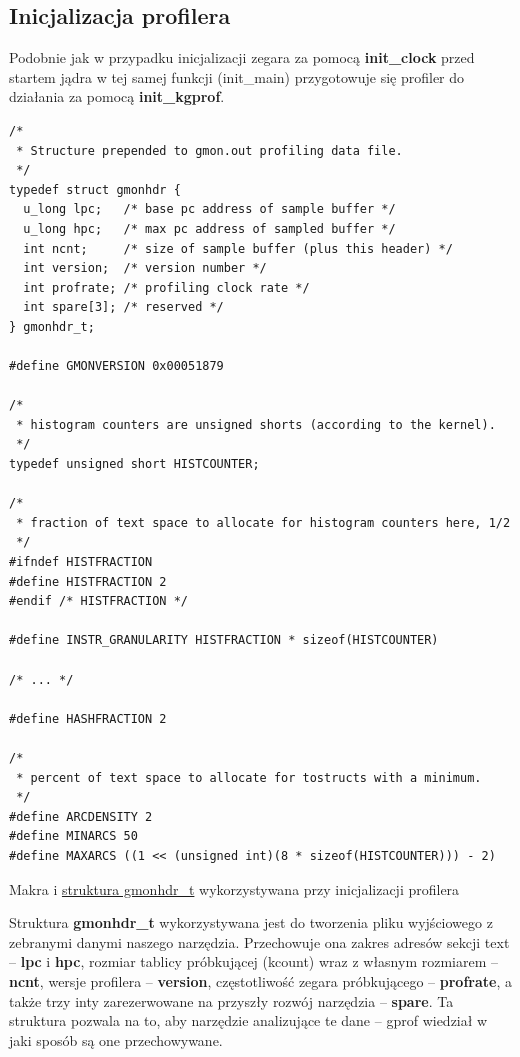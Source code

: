 \documentclass[shortabstract]{iithesis}
\theoremstyle{definition} \newtheorem*{definition}{Definicja}
\theoremstyle{definition} \newtheorem*{example}{Przykład}
\theoremstyle{definition} \newtheorem*{remark}{Uwaga}
\newenvironment{longlisting}{\captionsetup{type=listing}}{}
\begin{document}
\subsection{Inicjalizacja profilera}

Podobnie jak w przypadku inicjalizacji zegara za pomocą \textbf{init\_clock} przed startem jądra w tej samej funkcji (init\_main) przygotowuje się profiler do działania za pomocą \textbf{init\_kgprof}.

\begin{longlisting}
  \begin{verbatim}
/*
 * Structure prepended to gmon.out profiling data file.
 */
typedef struct gmonhdr {
  u_long lpc;   /* base pc address of sample buffer */
  u_long hpc;   /* max pc address of sampled buffer */
  int ncnt;     /* size of sample buffer (plus this header) */
  int version;  /* version number */
  int profrate; /* profiling clock rate */
  int spare[3]; /* reserved */
} gmonhdr_t;

#define GMONVERSION 0x00051879

/*
 * histogram counters are unsigned shorts (according to the kernel).
 */
typedef unsigned short HISTCOUNTER;

/*
 * fraction of text space to allocate for histogram counters here, 1/2
 */
#ifndef HISTFRACTION
#define HISTFRACTION 2
#endif /* HISTFRACTION */

#define INSTR_GRANULARITY HISTFRACTION * sizeof(HISTCOUNTER)

/* ... */

#define HASHFRACTION 2

/*
 * percent of text space to allocate for tostructs with a minimum.
 */
#define ARCDENSITY 2
#define MINARCS 50
#define MAXARCS ((1 << (unsigned int)(8 * sizeof(HISTCOUNTER))) - 2)

  \end{verbatim}
  \caption{Makra i \href{https://mimiker.ii.uni.wroc.pl/source/xref/mimiker/include/sys/gmon.h?r=27b8c19a\#47}{struktura gmonhdr\_t} wykorzystywana przy inicjalizacji profilera}
  \label{lst:structgmonhdr}
\end{longlisting}

Struktura \textbf{gmonhdr\_t} wykorzystywana jest do tworzenia pliku wyjściowego z zebranymi danymi naszego narzędzia. Przechowuje ona zakres adresów sekcji text -- \textbf{lpc} i \textbf{hpc}, rozmiar tablicy próbkującej (kcount) wraz z własnym rozmiarem -- \textbf{ncnt}, wersje profilera -- \textbf{version}, częstotliwość zegara próbkującego -- \textbf{profrate}, a także trzy inty zarezerwowane na przyszły rozwój narzędzia -- \textbf{spare}. Ta struktura pozwala na to, aby narzędzie analizujące te dane -- gprof wiedział w jaki sposób są one przechowywane.
\end{document}
